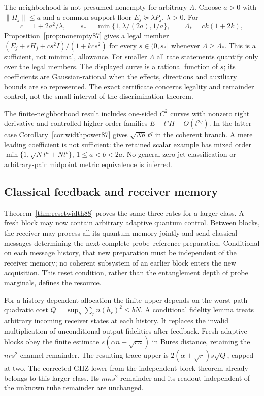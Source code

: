 The neighborhood is not presumed nonempty for arbitrary $\Lambda$.
Choose $a>0$ with $\|H_j\|\le a$ and a common support floor
$E_j\succeq\lambda P_j$, $\lambda>0$.  For
\[
 c=1+2a^2/\lambda,\qquad
 s_* =\min\{1,\lambda/(2a),1/a\},\qquad
 \Lambda_*=ck(1+2k),
\]
Proposition~\ref{prop:nonempty87} gives a legal member
$(E_j+sH_j+cs^2I)/(1+kcs^2)$ for every $s\in(0,s_*]$
whenever $\Lambda\ge\Lambda_*$.  This is a sufficient, not
minimal, allowance.  For smaller $\Lambda$ all rate statements
quantify only over the legal members.  The displayed curve is a
rational function of $s$; its coefficients are Gaussian-rational
when the effects, directions and auxiliary bounds are so represented.
The exact certificate concerns legality and remainder control,
not the small interval of the discrimination theorem.

The finite-neighborhood result includes one-sided $C^2$ curves with
nonzero right derivative and controlled higher-order families
$E+t^qH+O(t^{2q})$.  In the latter case
Corollary~\ref{cor:widthpower87} gives $\sqrt{Nb}\,t^q$
in the coherent branch.  A mere leading coefficient is not sufficient:
the retained scalar example has mixed order
$\min\{1,\sqrt N t^a+Nt^b\}$, $1\le a<b<2a$.
No general zero-jet classification or arbitrary-pair midpoint
metric equivalence is inferred.

\subsection{Classical feedback and receiver memory}
Theorem~\ref{thm:resetwidth88} proves the same three rates for a
larger class.  A fresh block may now contain arbitrary adaptive
quantum control.  Between blocks, the receiver may process all its
quantum memory jointly and send classical messages determining the
next complete probe--reference preparation.  Conditional on each
message history, that new preparation must be independent of the
receiver memory; no coherent subsystem of an earlier block enters
the new acquisition.  This reset condition, rather than the
entanglement depth of probe marginals, defines the resource.

For a history-dependent allocation the finite upper depends on the
worst-path quadratic cost $Q=\sup_h\sum_r n(h_r)^2\le bN$.
A conditional fidelity lemma treats arbitrary incoming receiver
states at each history.  It replaces the invalid multiplication of
unconditional output fidelities after feedback.  Fresh adaptive
blocks obey the finite estimate $s(\alpha n+\sqrt{rn})$ in Bures
distance, retaining the $nrs^2$ channel remainder.  The resulting
trace upper is $2(\alpha+\sqrt r)s\sqrt Q$, capped at two.
The corrected GHZ lower from the independent-block theorem already
belongs to this larger class.  Its $m\kappa s^2$ remainder and its
readout independent of the unknown tube remainder are unchanged.

